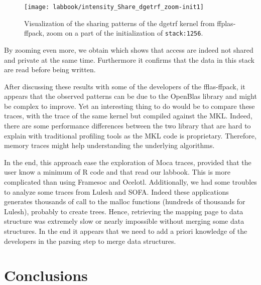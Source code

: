 \begin{figure}[htb]
    \centering
    \texttt{[image: labbook/intensity\_Share\_dgetrf\_zoom-init1]}
    \caption{Visualization of the sharing patterns of the dgetrf kernel from ffplas-ffpack, zoom on a part of the initialization of \texttt{stack:1256}.}
    \label{fig:dgetrf-share-zoom-init1}
\end{figure}

By zooming even more, we obtain  which shows that access are indeed not shared and private at the same time.
Furthermore it confirms that the data in this stack are read before being written.

After discussing these results with some of the developers of the fflas-ffpack, it appears that the observed patterns can be due to the OpenBlas library and might be complex to improve.
Yet an interesting thing to do would be to compare these traces, with the trace of the same kernel but compiled against the \gls{MKL}.
Indeed, there are some performance differences between the two library that are hard to explain with traditional profiling tools as the \gls{MKL} code is proprietary.
Therefore, memory traces might help understanding the underlying algorithms.

In the end, this approach ease the exploration of \gls{Moca} traces, provided that the user know a minimum of \gls{R} code and that read our labbook.
This is more complicated than using \gls{Framesoc} and \gls{Ocelotl}.
Additionally, we had some troubles to analyze some traces from Lulesh and \gls{SOFA}.
Indeed these applications generates thousands of call to the malloc functions (hundreds of thousands for Lulesh), probably to create trees.
Hence, retrieving the mapping page to data structure was extremely slow or nearly impossible without merging some data structures.
In the end it appears that we need to add a priori knowledge of the developers in the parsing step to merge data structures.

\section{Conclusions}
\label{sec:visu-cncl}

